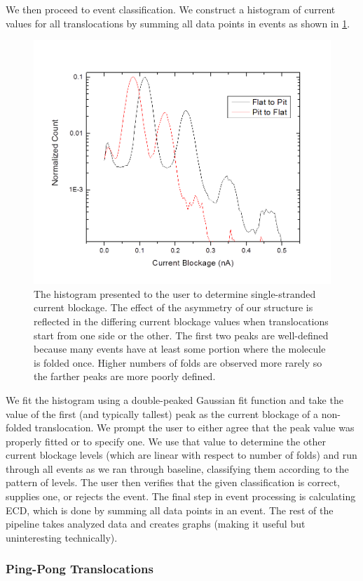 \documentclass[aps,prl,preprint,groupedaddress]{revtex4}
\begin{document}
We then proceed to event classification.
We construct a histogram of current values for all translocations by summing all data points in events as shown in \ref{fig:blockage-histogram}.
\begin{figure}[H]
\centering
\includegraphics[width=.8\textwidth]{figures/blockage-histogram}
\caption{The histogram presented to the user to determine single-stranded current blockage.
The effect of the asymmetry of our structure is reflected in the differing current blockage values when translocations start from one side or the other.
The first two peaks are well-defined because many events have at least some portion where the molecule is folded once.
Higher numbers of folds are observed more rarely so the farther peaks are more poorly defined.}
\label{fig:blockage-histogram}
\end{figure}
We fit the histogram using a double-peaked Gaussian fit function and take the value of the first (and typically tallest) peak as the current blockage of a non-folded translocation.
We prompt the user to either agree that the peak value was properly fitted or to specify one.
We use that value to determine the other current blockage levels (which are linear with respect to number of folds) and run through all events as we ran through baseline, classifying them according to the pattern of levels.
The user then verifies that the given classification is correct, supplies one, or rejects the event.
The final step in event processing is calculating ECD, which is done by summing all data points in an event.
The rest of the pipeline takes analyzed data and creates graphs (making it useful but uninteresting technically).

\subsubsection{Ping-Pong Translocations}
\end{document}

